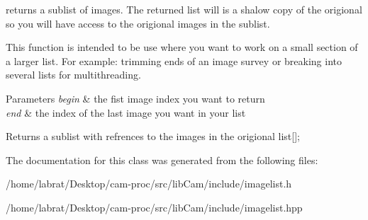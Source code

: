 returns a sublist of images. The returned list will is a shalow copy of the origional so you will have access to the origional images in the sublist. 

This function is intended to be use where you want to work on a small section of a larger list. For example\+: trimming ends of an image survey or breaking into several lists for multithreading. 
\begin{DoxyParams}{Parameters}
{\em begin} & the fist image index you want to return \\
\hline
{\em end} & the index of the last image you want in your list \\
\hline
\end{DoxyParams}
\begin{DoxyReturn}{Returns}
a sublist with refrences to the images in the origional list\mbox{[}\mbox{]};\textquotesingle{} 
\end{DoxyReturn}


The documentation for this class was generated from the following files\+:\begin{DoxyCompactItemize}
\item 
/home/labrat/\+Desktop/cam-\/proc/src/lib\+Cam/include/imagelist.\+h\item 
/home/labrat/\+Desktop/cam-\/proc/src/lib\+Cam/include/imagelist.\+hpp\end{DoxyCompactItemize}
